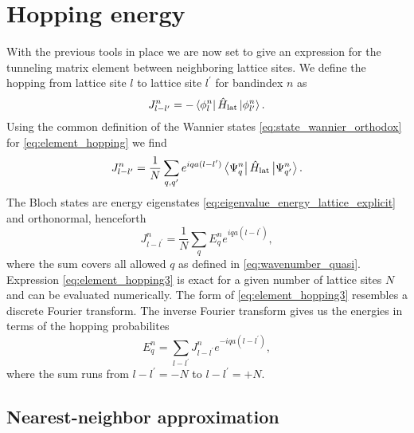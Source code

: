 \section{Hopping energy}

With the previous tools in place we are now set to give an expression for the
tunneling matrix element between neighboring lattice sites. We define the
hopping from lattice site $l$ to lattice site $l^\prime$ for bandindex $n$ as
\begin{equation}
  J^n_{l-l^\prime}
  =-\bra{\phi^n_l}\hat{H}_\text{lat}\ket{\phi^n_{l^\prime}}.
  \label{eq:element_hopping}
\end{equation}
Using the common definition of the Wannier states
\cref{eq:state_wannier_orthodox} for \cref{eq:element_hopping} we find
\begin{equation}
  J^n_{l-l^\prime}
  =\frac{1}{N}\sum_{q,q^\prime}e^{iqa(l-l^\prime)}
  \bra{\Psi^n_q}\hat{H}_\text{lat}\ket{\Psi^n_{q^\prime}}
  \label{eq:element_hopping2}.
\end{equation}
The Bloch states are energy eigenstates
\cref{eq:eigenvalue_energy_lattice_explicit} and orthonormal, henceforth
\begin{equation}
  J^n_{l-l^\prime}
  =\frac{1}{N}\sum_{q}E^n_qe^{iqa(l-l^\prime)}
  \label{eq:element_hopping3},
\end{equation}
where the sum covers all allowed $q$ as defined in \cref{eq:wavenumber_quasi}.
Expression \cref{eq:element_hopping3} is exact for a given number of lattice
sites $N$ and can be evaluated numerically. The form of
\cref{eq:element_hopping3} resembles a discrete Fourier transform. The
inverse Fourier transform gives us the energies in terms of the hopping
probabilites
\begin{equation}
  E^n_q
  =\sum_{l-l^\prime}J^n_{l-l^\prime}e^{-iqa(l-l^\prime)},
  \label{eq:element_energy_hopping}
\end{equation}
where the sum runs from $l-l^\prime=-N$ to $l-l^\prime=+N$.

\subsection{Nearest-neighbor approximation}

